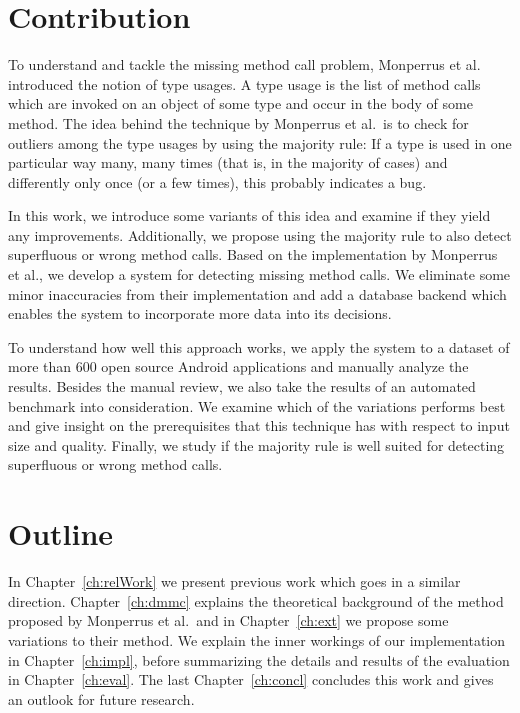 \section{Contribution}

To understand and tackle the missing method call problem, Monperrus et al.~\cite{monperrus2010detecting}\cite{monperrus2013detecting} introduced the notion of type usages.
A type usage is the list of method calls which are invoked on an object of some type and occur in the body of some method.
The idea behind the technique by Monperrus et al.\ is to check for outliers among the type usages by using the majority rule:
If a type is used in one particular way many, many times (that is, in the majority of cases) and differently only once (or a few times), this probably indicates a bug.

In this work, we introduce some variants of this idea and examine if they yield any improvements.
Additionally, we propose using the majority rule to also detect superfluous or wrong method calls.
Based on the implementation by Monperrus et al., we develop a system for detecting missing method calls.
We eliminate some minor inaccuracies from their implementation and add a database backend which enables the system to incorporate more data into its decisions.

To understand how well this approach works, we apply the system to a dataset of more than 600 open source Android applications and manually analyze the results.
Besides the manual review, we also take the results of an automated benchmark into consideration.
We examine which of the variations performs best and give insight on the prerequisites that this technique has with respect to input size and quality.
Finally, we study if the majority rule is well suited for detecting superfluous or wrong method calls.

\section{Outline}

In Chapter~\ref{ch:relWork} we present previous work which goes in a similar direction.
Chapter~\ref{ch:dmmc} explains the theoretical background of the method proposed by Monperrus et al.\ and in Chapter~\ref{ch:ext} we propose some variations to their method.
We explain the inner workings of our implementation in Chapter~\ref{ch:impl}, before summarizing the details and results of the evaluation in Chapter~\ref{ch:eval}.
The last Chapter~\ref{ch:concl} concludes this work and gives an outlook for future research.

